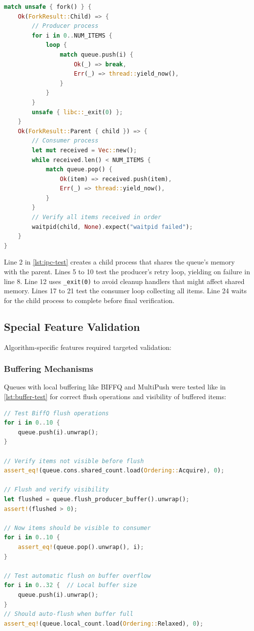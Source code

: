 \begin{lstlisting}[language=Rust, style=boxed, caption={IPC test structure}, label={lst:ipc-test}]
match unsafe { fork() } {
    Ok(ForkResult::Child) => {
        // Producer process
        for i in 0..NUM_ITEMS {
            loop {
                match queue.push(i) {
                    Ok(_) => break,
                    Err(_) => thread::yield_now(),
                }
            }
        }
        unsafe { libc::_exit(0) };
    }
    Ok(ForkResult::Parent { child }) => {
        // Consumer process
        let mut received = Vec::new();
        while received.len() < NUM_ITEMS {
            match queue.pop() {
                Ok(item) => received.push(item),
                Err(_) => thread::yield_now(),
            }
        }
        // Verify all items received in order
        waitpid(child, None).expect("waitpid failed");
    }
}
\end{lstlisting}

Line 2 in \cref{lst:ipc-test} creates a child process that shares the queue's memory with the parent. Lines 5 to 10 test the producer's retry loop, yielding on failure in line 8. Line 12 uses \texttt{\_exit(0)} to avoid cleanup handlers that might affect shared memory. Lines 17 to 21 test the consumer loop collecting all items. Line 24 waits for the child process to complete before final verification.

\subsection{Special Feature Validation}
Algorithm-specific features required targeted validation:

\subsubsection{Buffering Mechanisms}
Queues with local buffering like \ac{BIFFQ} and MultiPush were tested like in \cref{lst:buffer-test} for correct flush operations and visibility of buffered items:

\begin{lstlisting}[language=Rust, style=boxed, caption={Buffer mechanism test}, label={lst:buffer-test}]
// Test BiffQ flush operations
for i in 0..10 {
    queue.push(i).unwrap();
}

// Verify items not visible before flush
assert_eq!(queue.cons.shared_count.load(Ordering::Acquire), 0);

// Flush and verify visibility
let flushed = queue.flush_producer_buffer().unwrap();
assert!(flushed > 0);

// Now items should be visible to consumer
for i in 0..10 {
    assert_eq!(queue.pop().unwrap(), i);
}

// Test automatic flush on buffer overflow
for i in 0..32 {  // Local buffer size
    queue.push(i).unwrap();
}
// Should auto-flush when buffer full
assert_eq!(queue.local_count.load(Ordering::Relaxed), 0);
\end{lstlisting}

